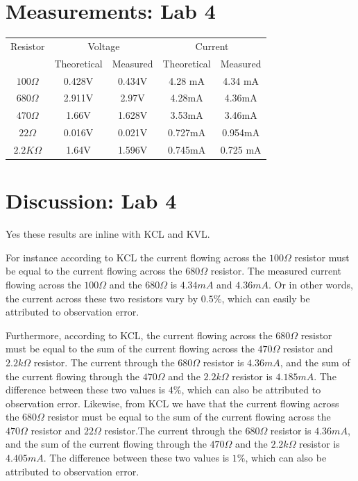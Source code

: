 \documentclass[12pt]{article}
\begin{document}
\section*{Measurements: Lab 4}
\begin{tabular}{||c|c|c|c|c||}
\hline
Resistor & \multicolumn{2}{|c|}{Voltage} &\multicolumn{2}{|c|}{Current}\\
& Theoretical & Measured & Theoretical& Measured\\
\hline
$100\Omega$ & 0.428V & 0.434V & 4.28 mA & 4.34 mA\\
\hline
$680\Omega$ &2.911V& 2.97V&4.28mA &4.36mA\\
\hline
$470\Omega$ &1.66V&1.628V&3.53mA&3.46mA\\
\hline
$22\Omega$&0.016V&0.021V&0.727mA&0.954mA\\
\hline
$2.2K\Omega$&1.64V&1.596V&0.745mA&0.725
mA\\
\hline
\end{tabular}
\pagebreak
\section*{Discussion: Lab 4}
Yes these results are inline with KCL and KVL. 

For instance according to KCL the current flowing across the $100\Omega$ resistor must be equal to the current flowing across the $680\Omega$ resistor. The measured current flowing across the $100\Omega$ and the $680\Omega$ is 
$4.34mA$ and $4.36mA$. Or in other words, the current across these two resistors vary by $0.5\%$, which can easily be attributed to observation error.

Furthermore, according to KCL, the current flowing across the $680\Omega$ resistor must be equal to the sum of the current flowing across the $470\Omega$ resistor and $2.2k\Omega$ resistor. The current through the $680\Omega$ resistor is $4.36mA$, and the sum of the current flowing through the $470\Omega$ and the $2.2k\Omega$ resistor is $4.185mA$. The difference between these two values is $4\%$, which can also be attributed to observation error. Likewise, from KCL we have that the current flowing across the $680\Omega$ resistor must be equal to the sum of the current flowing across the $470\Omega$ resistor and $22\Omega$ resistor.The current through the $680\Omega$ resistor is $4.36mA$, and the sum of the current flowing through the $470\Omega$ and the $2.2k\Omega$ resistor is $4.405mA$. The difference between these two values is $1\%$, which can also be attributed to observation error.
\end{document}
